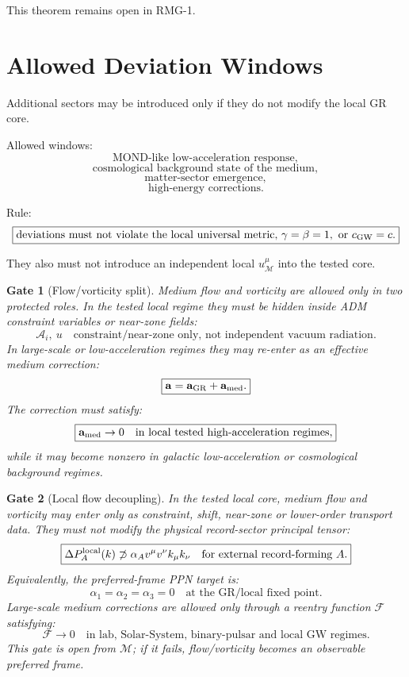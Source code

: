 \documentclass[11pt]{article}
\newtheorem{gate}{Gate}
\begin{document}
This theorem remains open in RMG-1.

\section{Allowed Deviation Windows}

Additional sectors may be introduced only if they do not modify the local GR core.

Allowed windows:
\[
\text{MOND-like low-acceleration response},
\]
\[
\text{cosmological background state of the medium},
\]
\[
\text{matter-sector emergence},
\]
\[
\text{high-energy corrections}.
\]

Rule:
\[
\boxed{
\text{deviations must not violate the local universal metric, }\gamma=\beta=1,
\text{ or }c_{\rm GW}=c.
}
\]

They also must not introduce an independent local $u^\mu_{\mathcal M}$ into the
tested core.

\begin{gate}[Flow/vorticity split]
Medium flow and vorticity are allowed only in two protected roles.
In the tested local regime they must be hidden inside ADM constraint variables
or near-zone fields:
\[
\boxed{
\mathcal A_i,\ u
\quad\text{constraint/near-zone only, not independent vacuum radiation.}
}
\]
In large-scale or low-acceleration regimes they may re-enter as an effective
medium correction:
\[
\boxed{
\mathbf a
=
\mathbf a_{\rm GR}
+
\mathbf a_{\rm med}.
}
\]
The correction must satisfy:
\[
\boxed{
\mathbf a_{\rm med}\to0
\quad
\text{in local tested high-acceleration regimes},
}
\]
while it may become nonzero in galactic low-acceleration or cosmological
background regimes.
\end{gate}

\begin{gate}[Local flow decoupling]
In the tested local core, medium flow and vorticity may enter only as
constraint, shift, near-zone or lower-order transport data.  They must not
modify the physical record-sector principal tensor:
\[
\boxed{
\Delta P_A^{\rm local}(k)
\not\supset
\alpha_A v^\mu v^\nu k_\mu k_\nu
\quad
\text{for external record-forming }A.
}
\]
Equivalently, the preferred-frame PPN target is:
\[
\boxed{
\alpha_1=\alpha_2=\alpha_3=0
\quad
\text{at the GR/local fixed point}.
}
\]
Large-scale medium corrections are allowed only through a reentry function
\(\mathcal F\) satisfying:
\[
\boxed{
\mathcal F\to0
\quad
\text{in lab, Solar-System, binary-pulsar and local GW regimes}.
}
\]
This gate is open from \(\mathcal M\); if it fails, flow/vorticity becomes an
observable preferred frame.
\end{gate}
\end{document}
